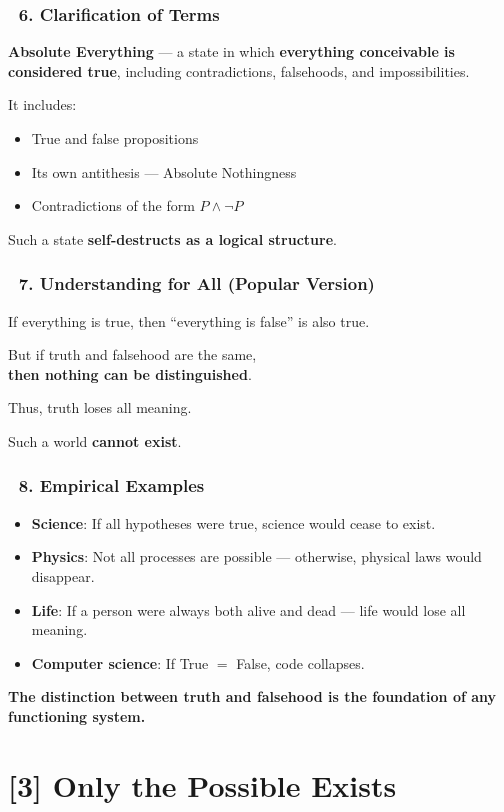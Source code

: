 \documentclass[12pt]{article}
\begin{document}
\subsubsection*{🔹 6. Clarification of Terms}
\textbf{Absolute Everything} — a state in which \textbf{everything conceivable is considered true}, including contradictions, falsehoods, and impossibilities.

It includes:
\begin{itemize}
\item True and false propositions
\item Its own antithesis — Absolute Nothingness
\item Contradictions of the form $P \wedge \neg P$
\end{itemize}

Such a state \textbf{self-destructs as a logical structure}.

\subsubsection*{🔹 7. Understanding for All (Popular Version)}
If everything is true, then ``everything is false'' is also true.

But if truth and falsehood are the same,\\
\textbf{then nothing can be distinguished}.

Thus, truth loses all meaning.

Such a world \textbf{cannot exist}.

\subsubsection*{🔹 8. Empirical Examples}
\begin{itemize}
\item \textbf{Science}: If all hypotheses were true, science would cease to exist.
\item \textbf{Physics}: Not all processes are possible — otherwise, physical laws would disappear.
\item \textbf{Life}: If a person were always both alive and dead — life would lose all meaning.
\item \textbf{Computer science}: If True $=$ False, code collapses.
\end{itemize}

\textbf{The distinction between truth and falsehood is the foundation of any functioning system.}


\section*{[3] Only the Possible Exists}
\end{document}
